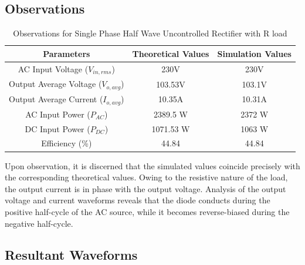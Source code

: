 \subsection{Observations}

\begin{table}[h]
    \renewcommand{\arraystretch}{1.3}
    \label{table_observation_single-phase-half-wave-uncontrolled-rectifier-with-R-load}
    \centering
    \begin{tabular}{|c|c|c|}
        \hline
        Parameters                              & Theoretical Values & Simulation Values \\
        \hline
        \hline
        AC Input Voltage ($ V_{in,rms} $)       & 230V               & 230V              \\
        \hline
        Output Average Voltage ($ V_{o,avg} $)  & 103.53V            & 103.1V            \\
        \hline
        Output Average Current ($ I_{o,avg}  $) & 10.35A             & 10.31A            \\
        \hline
        AC Input Power ($ P_{AC}  $)            & 2389.5 W           & 2372 W            \\
        \hline
        DC Input Power ($ P_{DC}  $)            & 1071.53 W          & 1063 W            \\
        \hline
        Efficiency (\%)                         & 44.84              & 44.84             \\
        \hline
    \end{tabular}
    \caption{Observations for Single Phase Half Wave Uncontrolled Rectifier with R load}

\end{table}


Upon observation, it is discerned that the simulated values coincide precisely with the corresponding theoretical values. Owing to the resistive nature of the load, the output current is in phase with the output voltage. Analysis of the output voltage and current waveforms reveals that the diode conducts during the positive half-cycle of the AC source, while it becomes reverse-biased during the negative half-cycle.

\pagebreak

\subsection{Resultant Waveforms}

